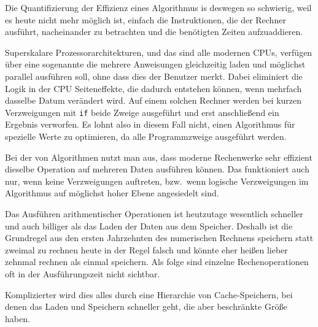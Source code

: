 \begin{remark}
  Die Quantifizierung der Effizienz eines Algorithmus is deswegen so
  schwierig, weil es heute nicht mehr möglich ist, einfach die
  Instruktionen, die der Rechner ausführt, nacheinander zu betrachten
  und die benötigten Zeiten aufzuaddieren.
  
  Superskalare Prozessorarchitekturen, und das sind alle modernen
  CPUs, verfügen über eine sogenannte 
  die mehrere Anweisungen gleichzeitig laden und möglichst parallel
  ausführen soll, ohne dass dies der Benutzer merkt. Dabei eliminiert
  die Logik in der CPU Seiteneffekte, die dadurch entstehen können,
  wenn mehrfach dasselbe Datum verändert wird. Auf einem solchen
  Rechner werden bei kurzen Verzweigungen mit \lstinline!if! beide
  Zweige ausgeführt und erst anschließend ein Ergebnis verworfen.  Es
  lohnt also in diesem Fall nicht, einen Algorithmus für spezielle
  Werte zu optimieren, da alle Programmzweige ausgeführt werden.

  Bei der  von Algorithmen nutzt man aus, dass
  moderne Rechenwerke sehr effizient dieselbe Operation auf mehreren
  Daten ausführen können. Das funktioniert auch nur, wenn keine
  Verzweigungen auftreten, bzw.\ wenn logische Verzweigungen im
  Algorithmus auf möglichst hoher Ebene angesiedelt sind.

  Das Ausführen arithmentischer Operationen ist heutzutage wesentlich
  schneller und auch billiger als das Laden der Daten aus dem
  Speicher. Deshalb ist die Grundregel aus den ersten Jahrzehnten des
  numerischen Rechnens \glqq{}speichern statt zweimal zu
  rechnen\grqq{} heute in der Regel falsch und könnte eher heißen
  \grqq{}lieber zehnmal rechnen als einmal speichern.\grqq{} Als folge
  sind einzelne Rechenoperationen oft in der Ausführungszeit nicht
  sichtbar.

  Komplizierter wird dies alles durch eine Hierarchie von
  Cache-Speichern, bei denen das Laden und Speichern schneller geht,
  die aber beschränkte Größe haben.
\end{remark}


